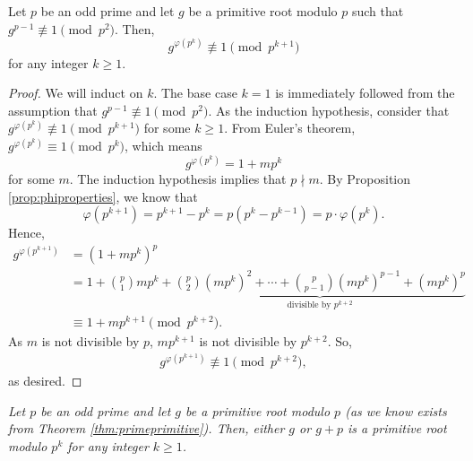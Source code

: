 \documentclass{subfile}
\begin{document}
	\begin{lemma}
		Let $p$ be an odd prime and let $g$ be a primitive root modulo $p$ such that $g^{p-1} \not \equiv 1 \pmod{p^2}$. Then, $$g^{\varphi(p^k)} \not \equiv 1 \pmod{p^{k+1}}$$ for any integer $k \geq 1$.
	\end{lemma}
	
	\begin{proof}
		We will induct on $k$. The base case $k=1$ is immediately followed from the assumption that $g^{p-1} \not \equiv 1 \pmod{p^2}$. As the induction hypothesis, consider that $g^{\varphi(p^k)} \not \equiv 1 \pmod{p^{k+1}}$ for some $k\geq 1$. From Euler's theorem, $g^{\varphi(p^k)} \equiv 1 \pmod{p^k}$, which means $$g^{\varphi(p^k)} = 1+mp^k$$ for some $m$. The induction hypothesis implies that $p \nmid m$. By Proposition \ref{prop:phiproperties}, we know that $$\varphi(p^{k+1})=p^{k+1}-p^k=p\left(p^k - p^{k-1}\right)=p\cdot \varphi(p^k).$$
		Hence,
			\begin{align*}
				g^{\varphi(p^{k+1})} &= (1+mp^k)^p \\
								&= 1+ \binom{p}{1}mp^k + \underbrace{\binom{p}{2} (mp^k)^2 + \cdots +\binom{p}{p-1} (mp^k)^{p-1} +(mp^k)^p}_{\mbox{divisible by }p^{k+2}}\\
								&\equiv 1+mp^{k+1} \pmod {p^{k+2}}.
			\end{align*}
		As $m$ is not divisible by $p$, $mp^{k+1}$ is not divisible by $p^{k+2}$. So,
			\begin{align*}
				g^{\varphi(p^{k+1})} \not \equiv 1 \pmod {p^{k+2}},
			\end{align*}
		as desired.
	\end{proof}
	
	\begin{theorem}\slshape\label{thm:primepowerprimitive}
		Let $p$ be an odd prime and let $g$ be a primitive root modulo $p$ (as we know exists from Theorem \ref{thm:primeprimitive}). Then, either $g$ or $g+p$ is a primitive root modulo $p^k$ for any integer $k\geq 1$.
	\end{theorem}
	
\end{document}

